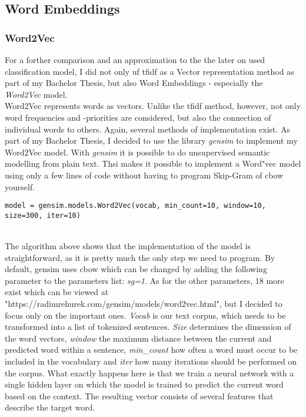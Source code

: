 \documentclass[a4paper, 11pt,titlepage,oneside,openany]{book}
\begin{document}
\subsection{Word Embeddings}
\subsubsection{Word2Vec} 
For a forther comparison and an approximation to the the later on used classification model, I did not only uf \gls{tfidf} as a Vector representation method as part of my Bachelor Thesis, but also Word Embeddings - especially the \textit{Word2Vec} model. \\
\noindent Word2Vec represents words as vectors. Unlike the  \gls{tfidf} method, however, not only word frequencies and -priorities are considered, but also the connection of individual words to others. Again, several methods of implementation exist. 
As part of my Bachelor Thesis, I decided to use  the library \textit{gensim} to implement my Word2Vec model. With \textit{gensim} it is  possible to do  unsupervised semantic modelling from plain text. Thsi makes it possible to implement a Word"vec model using only a few lines of code without having to program Skip-Gram of \gls{cbow} yourself. \\
\noindent
\begin{minipage}{\linewidth}
	\begin{lstlisting}[frame=single]
    model = gensim.models.Word2Vec(vocab, min_count=10, window=10, size=300, iter=10)
	\end{lstlisting}
\end{minipage} \\
\noindent The algorithm above shows that the implementation of the model is straightforward, as it is pretty much the only step we need to program. By default,  gensim uses \gls{cbow} which can be  changed  by adding the following parameter to the parameters list: \textit{sg=1}. As for the other parameters, 18 more exist which can be viewed at "https://radimrehurek.com/gensim/models/word2vec.html", but I decided to focus only on the important ones. \textit{Vocab} is our text corpus, which needs to be transformed into a list of tokenized sentences. \textit{Size} determines the dimension of the word vectors, \textit{window} the maximum distance between the current and predicted word within a sentence, \textit{min\_count}  how often a word must occur to be included in the vocabulary and \textit{iter} how many iterations  should be performed on the corpus. What exactly happens here is that we train a neural network with a single hidden layer on which the model is trained to predict the current word based on the context. The resulting vector consists of several features that describe the target word.\\
\end{document}
